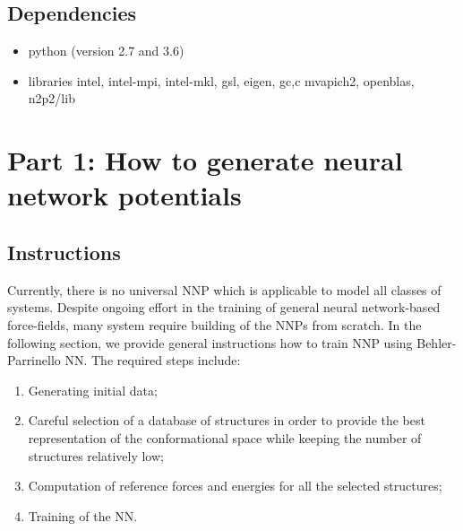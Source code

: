 \documentclass[12pt]{article}
\begin{document}
\subsection{Dependencies}
\begin{itemize}
    \item python (version 2.7 and 3.6)
    \item libraries intel, intel-mpi, intel-mkl, gsl, eigen, gc,c mvapich2, openblas, n2p2/lib
\end{itemize}
%
%
%
%
\newpage
%
\section{Part 1: How to generate neural network potentials}
\subsection*{Instructions}

Currently, there is no universal NNP which is applicable to model all classes of systems. Despite ongoing effort in the training of general neural network-based force-fields, many system require building of the NNPs from scratch. In the following section, we provide general instructions how to train NNP using Behler-Parrinello NN. The required steps include: 

\begin{enumerate}
    \item Generating initial data;
    \item Careful selection of a database of structures in order to provide the best representation of the conformational space while keeping the number of structures relatively low;
    \item Computation of reference forces and energies for all the selected structures;
    \item Training of the NN.
\end{enumerate}
%
\end{document}
